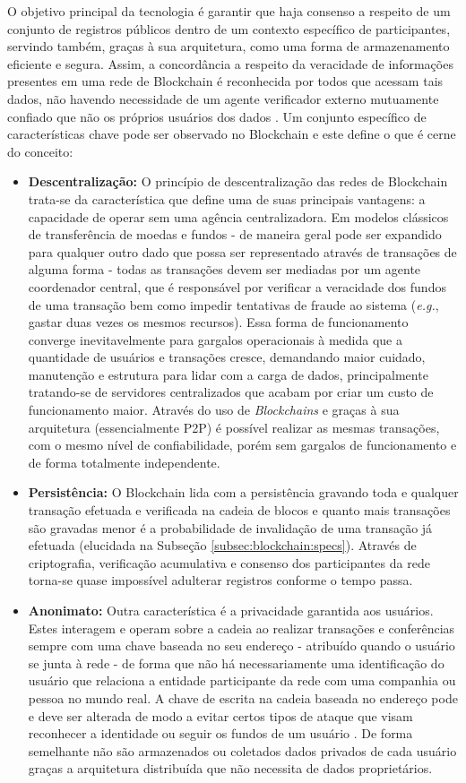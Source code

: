 %
O objetivo principal da tecnologia é garantir que haja consenso a respeito de um conjunto de registros públicos dentro de um contexto específico de participantes, servindo também, graças à sua arquitetura, como uma forma de armazenamento eficiente e segura. Assim, a concordância a respeito da veracidade de informações presentes em uma rede de Blockchain é reconhecida por todos que acessam tais dados, não havendo necessidade de um agente verificador externo mutuamente confiado que não os próprios usuários dos dados \cite{blockchain:survey}.
%
Um conjunto específico de características chave pode ser observado no Blockchain e este define o que é cerne do conceito:
\begin{itemize}
    \item \textbf{Descentralização:} O princípio de descentralização das redes de Blockchain trata-se da característica que define uma de suas principais vantagens: a capacidade de operar sem uma agência centralizadora. Em modelos clássicos de transferência de moedas e fundos - de maneira geral pode ser expandido para qualquer outro dado que possa ser representado através de transações de alguma forma - todas as transações devem ser mediadas por um agente coordenador central, que é responsável por verificar a veracidade dos fundos de uma transação bem como impedir tentativas de fraude ao sistema (\textit{e.g.}, gastar duas vezes os mesmos recursos). Essa forma de funcionamento converge inevitavelmente para gargalos operacionais à medida que a quantidade de usuários e transações cresce, demandando maior cuidado, manutenção e estrutura para lidar com a carga de dados, principalmente tratando-se de servidores centralizados que acabam por criar um custo de funcionamento maior. Através do uso de \textit{Blockchains} e graças à sua arquitetura (essencialmente \ac{P2P}) é possível realizar as mesmas transações, com o mesmo nível de confiabilidade, porém sem gargalos de funcionamento e de forma totalmente independente.
    \item \textbf{Persistência:} O Blockchain lida com a persistência gravando toda e qualquer transação efetuada e verificada na cadeia de blocos e quanto mais transações são gravadas menor é a probabilidade de invalidação de uma transação já efetuada (elucidada na Subseção \ref{subsec:blockchain:specs}). Através de criptografia, verificação acumulativa e consenso dos participantes da rede torna-se quase impossível adulterar registros conforme o tempo passa.
    \item \textbf{Anonimato:} Outra característica é a privacidade garantida aos usuários. Estes interagem e operam sobre a cadeia ao realizar transações e conferências sempre com uma chave baseada no seu endereço - atribuído quando o usuário se junta à rede - de forma que não há necessariamente uma identificação do usuário que relaciona a entidade participante da rede com uma companhia ou pessoa no mundo real. A chave de escrita na cadeia baseada no endereço pode e deve ser alterada de modo a evitar certos tipos de ataque que visam reconhecer a identidade ou seguir os fundos de um usuário \cite{blockchain:survey_bitcoin}. De forma semelhante não são armazenados ou coletados dados privados de cada usuário graças a arquitetura distribuída que não necessita de dados proprietários.

\end{itemize}
